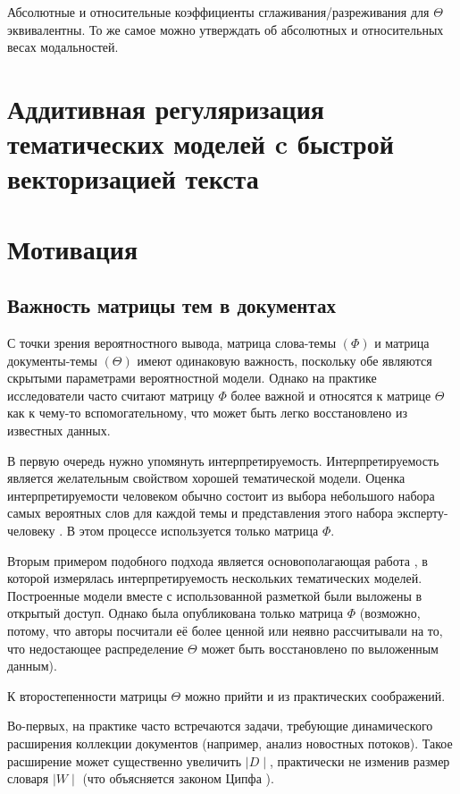 Абсолютные и относительные коэффициенты сглаживания/разреживания для $\Theta$ эквивалентны. То же самое можно утверждать об абсолютных и относительных весах модальностей.

\section{Аддитивная регуляризация тематических моделей c быстрой векторизацией текста}

\section{Мотивация}

\subsection{Важность матрицы тем в документах}

С точки зрения вероятностного вывода, матрица слова-темы $(\Phi)$ и матрица документы-темы $(\Theta)$ имеют одинаковую важность, поскольку обе являются скрытыми параметрами вероятностной модели. Однако на практике исследователи часто считают матрицу $\Phi$ более важной и относятся к матрице $\Theta$ как к чему-то вспомогательному, что может быть легко восстановлено из известных данных.

В первую очередь нужно упомянуть интерпретируемость. Интерпретируемость является желательным свойством хорошей тематической модели. Оценка интерпретируемости человеком обычно состоит из выбора небольшого набора самых вероятных слов для каждой темы и представления этого набора эксперту-человеку \cite{roder2015exploring}. В этом процессе используется только матрица $\Phi$.

Вторым примером подобного подхода является основополагающая работа \cite{rtl}, в которой измерялась интерпретируемость нескольких тематических моделей. Построенные модели вместе с использованной разметкой были выложены в открытый доступ. Однако была опубликована только матрица $\Phi $ (возможно, потому, что авторы посчитали её более ценной или неявно рассчитывали на то, что недостающее распределение $\Theta$ может быть восстановлено по выложенным данным).

К второстепенности матрицы $\Theta$ можно прийти и из практических соображений.

Во-первых, на практике часто встречаются задачи, требующие динамического расширения коллекции документов (например, анализ новостных потоков). Такое расширение может существенно увеличить $\mid D\mid$, практически не изменив размер словаря $\mid W \mid$ (что объясняется законом Ципфа ).

